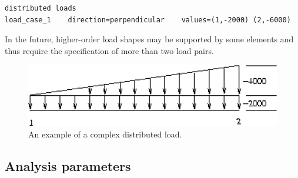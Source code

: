 \begin{screen} 
 \begin{verbatim} 
distributed loads
load_case_1    direction=perpendicular    values=(1,-2000) (2,-6000)
 \end{verbatim} 
\end{screen}

In the future, higher-order load shapes may be 
supported by some elements and thus require the specification of more than 
two load pairs.	

\begin{figure}
 \begin{center}
  \includegraphics[width=5in]{figures/load_fig}
 \end{center}
 \caption{An example of a complex distributed load.}
 \label{problem.load_fig}
\end{figure}

\subsection{Analysis parameters}

